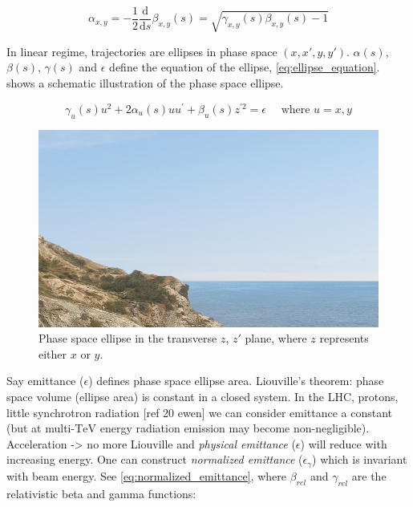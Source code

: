 \begin{equation}
    \alpha_{x, y} = -\frac{1}{2} \frac{\mathrm{d}}{\mathrm{d}s} \beta_{x, y}(s) = \sqrt{\gamma_{x, y}(s) \beta_{x, y}(s) - 1}
    \label{eq:alpha_function}
\end{equation}
\bigbreak

In linear regime, trajectories are ellipses in phase space $(x, x\prime, y, y\prime)$.
$\alpha(s)$, $\beta(s)$, $\gamma(s)$ and $\epsilon$ define the equation of the ellipse, \cref{eq:ellipse_equation}.
 shows a schematic illustration of the phase space ellipse.
\bigbreak

\begin{equation}
    \gamma_{u}(s) u^{2} + 2 \alpha_{u}(s) u u^{\prime} + \beta_{u}(s) z^{\prime 2} = \epsilon \quad \text { where } u = x, y
    \label{eq:ellipse_equation}
\end{equation}
\bigbreak

\begin{figure}[!htb]
    \begin{center}
    \includegraphics[width = 0.85\linewidth]{Figures/placeholder.png}
    \caption{Phase space ellipse in the transverse $z$, $z\prime$ plane, where $z$ represents either $x$ or $y$.}
    \label{fig:phase_space_ellipse}
    \end{center}
\end{figure}

Say emittance ($\epsilon$) defines phase space ellipse area.
Liouville's theorem: phase space volume (ellipse area) is constant in a closed system.
In the LHC, protons, little synchrotron radiation [ref 20 ewen] we can consider emittance a constant (but at multi-$\mathrm{TeV}$ energy radiation emission may become non-negligible).
Acceleration -> no more Liouville and \emph{physical emittance} ($\epsilon$) will reduce with increasing energy.
One can construct \emph{normalized emittance} ($\epsilon_{\gamma}$) which is invariant with beam energy.
See \cref{eq:normalized_emittance}, where $\beta_{rel}$ and $\gamma_{rel}$ are the relativistic beta and gamma functions:
\bigbreak

